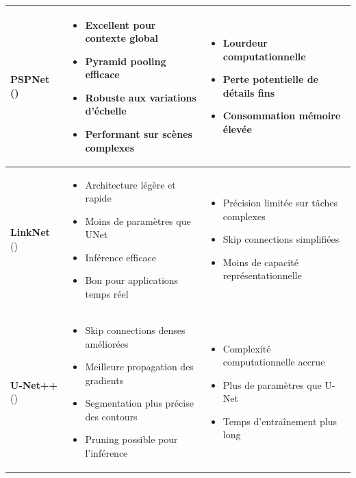 \begin{longtable}{|p{2.2cm}|p{6cm}|p{6cm}|}
\textbf{PSPNet} (\citeyear{zhao_pyramid_2017}) \cite{zhao_pyramid_2017} & 
\begin{itemize}[leftmargin=0.4cm]
    \item Excellent pour contexte global
    \item Pyramid pooling efficace
    \item Robuste aux variations d'échelle
    \item Performant sur scènes complexes
\end{itemize} & 
\begin{itemize}[leftmargin=0.4cm]
    \item Lourdeur computationnelle
    \item Perte potentielle de détails fins
    \item Consommation mémoire élevée
\end{itemize} \\
\hline

\textbf{LinkNet} (\citeyear{chaurasia_linknet_2017}) \cite{chaurasia_linknet_2017} & 
\begin{itemize}[leftmargin=0.4cm]
    \item Architecture légère et rapide
    \item Moins de paramètres que UNet
    \item Inférence efficace
    \item Bon pour applications temps réel
\end{itemize} & 
\begin{itemize}[leftmargin=0.4cm]
    \item Précision limitée sur tâches complexes
    \item Skip connections simplifiées
    \item Moins de capacité représentationnelle
\end{itemize} \\
\hline

\textbf{U-Net++} (\citeyear{zhou_unet_2018}) \cite{zhou_unet_2018} & 
\begin{itemize}[leftmargin=0.4cm]
    \item Skip connections denses améliorées
    \item Meilleure propagation des gradients
    \item Segmentation plus précise des contours
    \item Pruning possible pour l'inférence
\end{itemize} & 
\begin{itemize}[leftmargin=0.4cm]
    \item Complexité computationnelle accrue
    \item Plus de paramètres que U-Net
    \item Temps d'entraînement plus long
\end{itemize} \\
\hline


\end{longtable}
